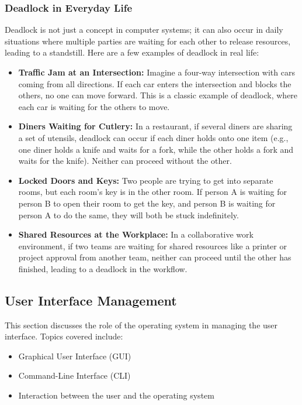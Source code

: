 \documentclass{article}
\begin{document}
\subsubsection{Deadlock in Everyday Life}
Deadlock is not just a concept in computer systems; it can also occur in daily situations where multiple parties are waiting for each other to release resources, leading to a standstill. Here are a few examples of deadlock in real life:

\begin{itemize}
    \item \textbf{Traffic Jam at an Intersection:} Imagine a four-way intersection with cars coming from all directions. If each car enters the intersection and blocks the others, no one can move forward. This is a classic example of deadlock, where each car is waiting for the others to move.
    
    \item \textbf{Diners Waiting for Cutlery:} In a restaurant, if several diners are sharing a set of utensils, deadlock can occur if each diner holds onto one item (e.g., one diner holds a knife and waits for a fork, while the other holds a fork and waits for the knife). Neither can proceed without the other.
    
    \item \textbf{Locked Doors and Keys:} Two people are trying to get into separate rooms, but each room’s key is in the other room. If person A is waiting for person B to open their room to get the key, and person B is waiting for person A to do the same, they will both be stuck indefinitely.
    
    \item \textbf{Shared Resources at the Workplace:} In a collaborative work environment, if two teams are waiting for shared resources like a printer or project approval from another team, neither can proceed until the other has finished, leading to a deadlock in the workflow.
\end{itemize}

\subsection{User Interface Management}
This section discusses the role of the operating system in managing the user interface. Topics covered include:
\begin{itemize}
    \item Graphical User Interface (GUI)
    \item Command-Line Interface (CLI)
    \item Interaction between the user and the operating system
\end{itemize}
\end{document}
